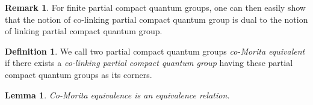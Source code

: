 \documentclass[10pt]{article}
\newtheorem{Lem}[Theorem]{Lemma}
\theoremstyle{definition}
\newtheorem{Def}[Theorem]{Definition}
\newtheorem{Rem}[Theorem]{Remark}
\numberwithin{equation}{section}
\begin{document}
\begin{Rem} For finite partial compact quantum groups, one can then easily show that the notion of co-linking partial compact quantum group is dual to the notion of linking partial compact quantum group.\end{Rem}

\begin{Def} We call two partial compact quantum groups \emph{co-Morita equivalent} if there exists a \emph{co-linking partial compact quantum group} having these partial compact quantum groups as its corners.
\end{Def}

\begin{Lem} Co-Morita equivalence is an equivalence relation. 
\end{Lem} 
\end{document}
